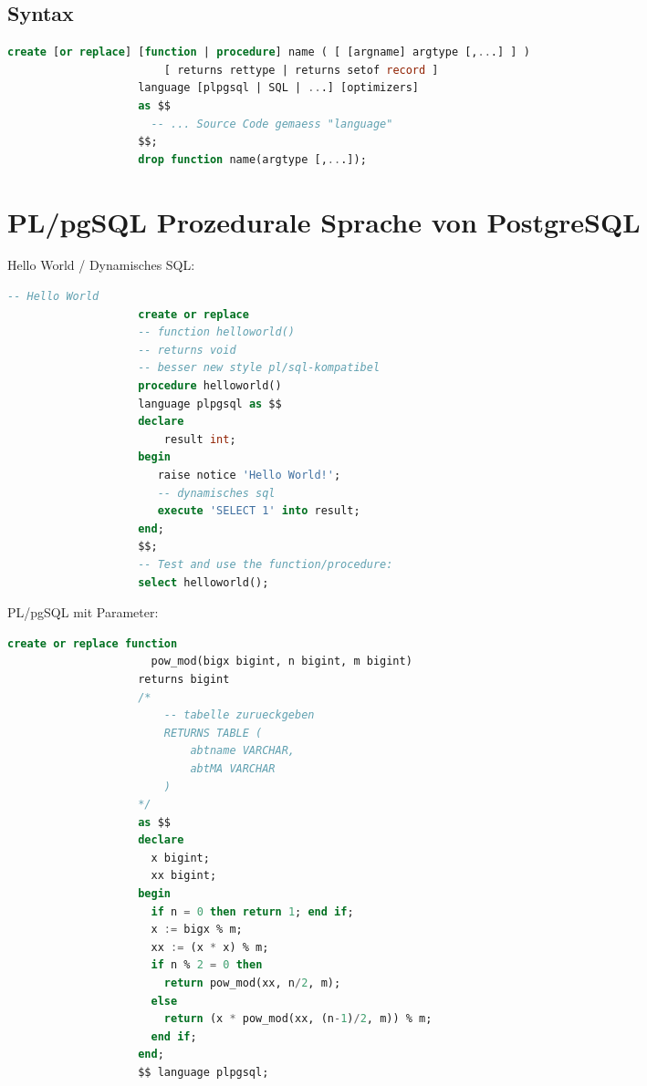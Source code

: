 \documentclass[a4paper, landscape, 8pt]{scrartcl}
\begin{document}
\begin{multicols*}{4}
        \subsection{Syntax}
        \begin{lstlisting}[language=sql]
                    create [or replace] [function | procedure] name ( [ [argname] argtype [,...] ] )
                        [ returns rettype | returns setof record ]
                    language [plpgsql | SQL | ...] [optimizers]
                    as $$
                      -- ... Source Code gemaess "language"
                    $$;
                    drop function name(argtype [,...]);
        \end{lstlisting}

        \section{PL/pgSQL \tiny{Prozedurale Sprache von PostgreSQL}}
        Hello World / Dynamisches SQL: \\
        \begin{lstlisting}[language=sql]
                    -- Hello World
                    create or replace
                    -- function helloworld()
                    -- returns void
                    -- besser new style pl/sql-kompatibel
                    procedure helloworld()
                    language plpgsql as $$
                    declare
                        result int;
                    begin
                       raise notice 'Hello World!';
                       -- dynamisches sql
                       execute 'SELECT 1' into result;
                    end;
                    $$;
                    -- Test and use the function/procedure:
                    select helloworld();
        \end{lstlisting}

        PL/pgSQL mit Parameter: \\
        \begin{lstlisting}[language=sql]
                    create or replace function
                      pow_mod(bigx bigint, n bigint, m bigint)
                    returns bigint
                    /*
                        -- tabelle zurueckgeben
                        RETURNS TABLE (
                            abtname VARCHAR,
                            abtMA VARCHAR
                        )
                    */
                    as $$
                    declare
                      x bigint;
                      xx bigint;
                    begin
                      if n = 0 then return 1; end if;
                      x := bigx % m;
                      xx := (x * x) % m;
                      if n % 2 = 0 then
                        return pow_mod(xx, n/2, m);
                      else
                        return (x * pow_mod(xx, (n-1)/2, m)) % m;
                      end if;
                    end;
                    $$ language plpgsql;
        \end{lstlisting}


\end{multicols*}
\end{document}
